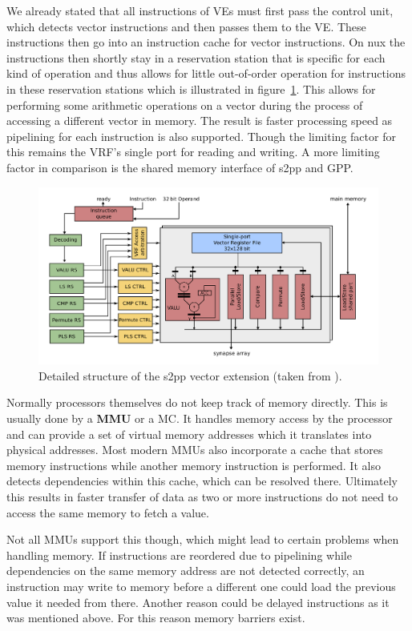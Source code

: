 {We already stated that all instructions of \ac{VE}s must first pass the control unit, which detects vector instructions and then passes them to the \ac{VE}.
These instructions then go into an instruction cache for vector instructions. 
On nux the instructions then shortly stay in a reservation station that is specific for each kind of operation and thus allows for little out-of-order operation for instructions in these reservation stations which is illustrated in figure~\ref{fig:s2pp}.
This allows for performing some arithmetic operations on a vector during the process of accessing a different vector in memory.
The result is faster processing speed as pipelining for each instruction is also supported.
Though the limiting factor for this remains the \ac{VRF}'s single port for reading and writing.
A more limiting factor in comparison is the shared memory interface of \ac{s2pp} and \ac{GPP}.
\begin{figure}[htbp]
    \centering
    \includegraphics[width=\textwidth]{pictures/s2pp.png}
    \caption{\label{fig:s2pp} Detailed structure of the \ac{s2pp} vector extension (taken from \cite{PPU}).}
\end{figure}

Normally processors themselves do not keep track of memory directly.
This is usually done by a \textbf{\ac{MMU}} or a \ac{MC}.
It handles memory access by the processor and can provide a set of virtual memory addresses which it translates into physical addresses.
Most modern \ac{MMU}s also incorporate a cache that stores memory instructions while another memory instruction is performed.
It also detects dependencies within this cache, which can be resolved there.
Ultimately this results in faster transfer of data as two or more instructions do not need to access the same memory to fetch a value.

Not all \ac{MMU}s support this though, which might lead to certain problems when handling memory.
If instructions are reordered due to pipelining while dependencies on the same memory address are not detected correctly, an instruction may write to memory before a different one could load the previous value it needed from there.
Another reason could be delayed instructions as it was mentioned above.
For this reason memory barriers exist.

}
